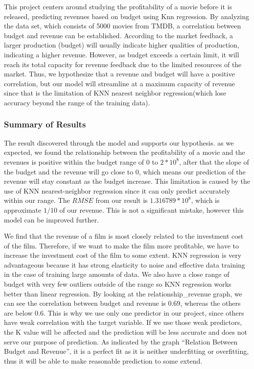\documentclass[
]{article}
\begin{document}
This project centers around studying the profitability of a movie before it is released, predicting revenues based on budget using Knn regression. By analyzing the data set, which consists of 5000 movies from TMDB, a correlation between budget and revenue can be established. According to the market feedback, a larger production (budget) will usually indicate higher qualities of production, indicating a higher revenue. However, as budget exceeds a certain limit, it will reach its total capacity for revenue feedback due to the limited resources of the market. Thus, we hypothesize that a revenue and budget will have a positive correlation, but our model will streamline at a maximum capacity of revenue since that is the limitation of KNN nearest neighbor regression(which lose accuracy beyond the range of the training data).

\hypertarget{summary-of-results}{%
\subsubsection{Summary of Results}\label{summary-of-results}}

The result discovered through the model and supports our hypothesis. as we expected, we found the relationship between the profitability of a movie and the revenues is positive within the budget range of \(0\) to \(2*10^8\), after that the slope of the budget and the revenue will go close to 0, which means our prediction of the revenue will stay constant as the budget increase. This limitation is caused by the use of KNN nearest-neighbor regression since it can only predict accurately within our range. The \(RMSE\) from our result is
\(1.316789*10^8\), which is approximate \(1/10\) of our revenue. This is not a significant mistake, however this model can be improved further.

We find that the revenue of a film is most closely related to the investment cost of the film. Therefore, if we want to make the film more profitable, we have to increase the investment cost of the film to some extent. KNN regression is very advantageous because it has strong elasticity to noise and effective data training in the case of training large amounts of data. We also have a close range of budget with very few outliers outside of the range so KNN regression works better than linear regression. By looking at the relationship\_revenue graph, we can see the correlation between budget and revenue is 0.69, whereas the others are below 0.6. This is why we use only one predictor in our project, since others have weak correlation with the target variable. If we use those weak predictors, the K value will be affected and the prediction will be less accurate and does not serve our purpose of prediction. As indicated by the graph ``Relation Between Budget and Revenue'', it is a perfect fit as it is neither underfitting or overfitting, thus it will be able to make reasonable prediction to some extend.
\end{document}
